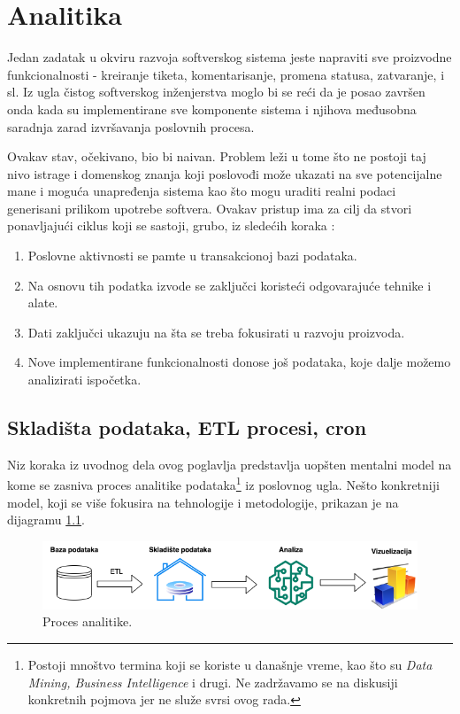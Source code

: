 \documentclass[12pt,oneside]{memoir}
\begin{document}
\chapter{Analitika}

Jedan zadatak u okviru razvoja softverskog sistema jeste napraviti sve proizvodne funkcionalnosti - kreiranje tiketa, komentarisanje, promena statusa, zatvaranje, i sl. Iz ugla čistog softverskog inženjerstva moglo bi se reći da je posao završen onda kada su implementirane sve komponente sistema i njihova međusobna saradnja zarad izvršavanja poslovnih procesa.

Ovakav stav, očekivano, bio bi naivan. Problem leži u tome što ne postoji taj nivo istrage i domenskog znanja koji poslovođi može ukazati na sve potencijalne mane i moguća unapređenja sistema kao što mogu uraditi realni podaci generisani prilikom upotrebe softvera. Ovakav pristup ima za cilj da stvori ponavljajući ciklus koji se sastoji, grubo, iz sledećih koraka \cite{dataanalytics}:
\begin{enumerate}
    \item Poslovne aktivnosti se pamte u transakcionoj bazi podataka.
    \item Na osnovu tih podatka izvode se zaključci koristeći odgovarajuće tehnike i alate.
    \item Dati zaključci ukazuju na šta se treba fokusirati u razvoju proizvoda.
    \item Nove implementirane funkcionalnosti donose još podataka, koje dalje možemo analizirati ispočetka.
\end{enumerate}

\section{Skladišta podataka, ETL procesi, cron}

Niz koraka iz uvodnog dela ovog poglavlja predstavlja uopšten mentalni model na kome se zasniva proces analitike podataka\footnote{Postoji mnoštvo termina koji se koriste u današnje vreme, kao što su \textit{Data Mining, Business Intelligence} i drugi. Ne zadržavamo se na diskusiji konkretnih pojmova jer ne služe svrsi ovog rada.} iz poslovnog ugla. Nešto konkretniji model, koji se više fokusira na tehnologije i metodologije, prikazan je na dijagramu \ref{fig:datadiag}.

\begin{figure}[h]
  \centering
  \includegraphics[width=1\textwidth]{docs/images/ch_5/datadiag.png} 
  \caption{Proces analitike.}
  \label{fig:datadiag}
\end{figure}
\end{document}
